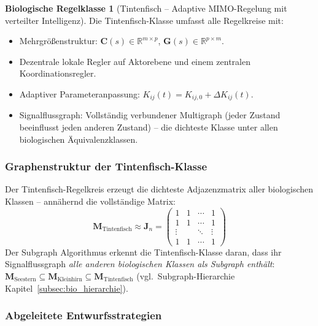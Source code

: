 \documentclass[a4paper,12pt]{article}
\theoremstyle{definition}
\newtheorem{klasse}{Biologische Regelklasse}
\begin{document}
\begin{klasse}[Tintenfisch -- Adaptive MIMO-Regelung mit verteilter Intelligenz]
	\label{kl:tintenfisch}
	Die Tintenfisch-Klasse umfasst alle Regelkreise mit:
	\begin{itemize}
		\item Mehrgrößenstruktur: $\mathbf{C}(s) \in \mathbb{R}^{m \times p}$,
		$\mathbf{G}(s) \in \mathbb{R}^{p \times m}$.
		\item Dezentrale lokale Regler auf Aktorebene und einem zentralen
		Koordinationsregler.
		\item Adaptiver Parameteranpassung: $K_{ij}(t) = K_{ij,0} + \Delta K_{ij}(t)$.
		\item Signalflussgraph: Vollständig verbundener Multigraph (jeder Zustand
		beeinflusst jeden anderen Zustand) -- die dichteste Klasse unter
		allen biologischen Äquivalenzklassen.
	\end{itemize}
\end{klasse}

\subsubsection{Graphenstruktur der Tintenfisch-Klasse}

Der Tintenfisch-Regelkreis erzeugt die dichteste Adjazenzmatrix aller
biologischen Klassen -- annähernd die vollständige Matrix:
\[
\mathbf{M}_{\text{Tintenfisch}} \approx \mathbf{J}_n = \begin{pmatrix} 1 & 1 & \cdots & 1 \\ 1 & 1 & \cdots & 1 \\ \vdots & & \ddots & \vdots \\ 1 & 1 & \cdots & 1 \end{pmatrix}
\]
Der Subgraph Algorithmus erkennt die Tintenfisch-Klasse daran, dass ihr
Signalflussgraph \emph{alle anderen biologischen Klassen als Subgraph enthält}:
$\mathbf{M}_{\text{Seestern}} \subseteq \mathbf{M}_{\text{Kleinhirn}} \subseteq
\mathbf{M}_{\text{Tintenfisch}}$ (vgl.\ Subgraph-Hierarchie
Kapitel~\ref{subsec:bio_hierarchie}).

\subsubsection{Abgeleitete Entwurfsstrategien}
\end{document}
